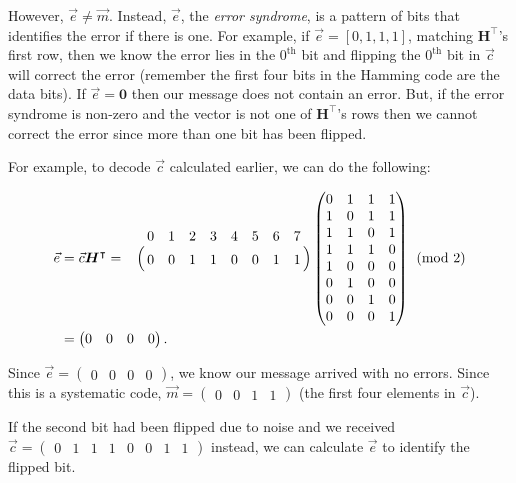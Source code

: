 \documentclass[11pt]{article}
\begin{document}
However, $\Vec{e} \neq \Vec{m}$.  Instead, $\Vec{e}$, the \emph{error
syndrome}, is a pattern of bits that identifies the error if there is
one. For example, if $\Vec{e} = [0, 1, 1, 1]$, matching
$\boldsymbol{H}^\intercal$'s first row, then we know the error lies in
the $0^\text{th}$ bit and flipping the $0^\text{th}$ bit in $\Vec{c}$
will correct the error (remember the first four bits in the Hamming code
are the data bits). If $\Vec{e} = \boldsymbol{0}$ then our message does
not contain an error. But, if the error syndrome is non-zero and the
vector is not one of $\boldsymbol{H}^\intercal$'s rows then we cannot
correct the error since more than one bit has been flipped.

For example, to decode $\Vec{c}$ calculated earlier, we can do the following:

\begin{align*}
  \Vec{e}&=\Vec{c}\boldsymbol{H^{\intercal}} =
  \bordermatrix{
    ~ & 0 & 1 & 2 & 3 & 4 & 5 & 6 & 7\cr
    ~ & 0 & 0 & 1 & 1 & 0 & 0 & 1 & 1\cr
  }
  \begin{pmatrix}
     0 & 1 & 1 & 1 \\
     1 & 0 & 1 & 1 \\
     1 & 1 & 0 & 1 \\
     1 & 1 & 1 & 0 \\
     1 & 0 & 0 & 0 \\
     0 & 1 & 0 & 0 \\
     0 & 0 & 1 & 0 \\
     0 & 0 & 0 & 1
  \end{pmatrix} \pmod{2} \\
  &= \begin{pmatrix}0 & 0 & 0 & 0 \end{pmatrix}.
\end{align*}

\noindent Since $\Vec{e} = \begin{pmatrix}0 & 0 & 0 & 0 \end{pmatrix}$,
we know our message arrived with no errors. Since this is a systematic
code, $\Vec{m} = \begin{pmatrix}0 & 0 & 1 & 1 \end{pmatrix}$ (the first
four elements in $\Vec{c}$).

If the second bit had been flipped due to noise and we received $\Vec{c}
= \begin{pmatrix}0 & 1 & 1 & 1 & 0 & 0 & 1 & 1\end{pmatrix}$ instead, we
can calculate $\Vec{e}$ to identify the flipped bit.
\end{document}
